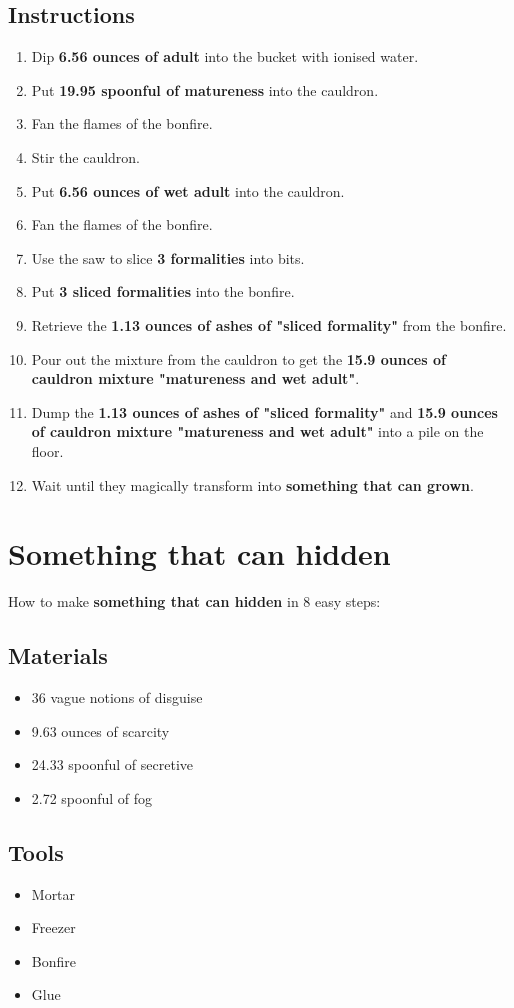 \documentclass{article}
\begin{document}
\subsection{Instructions}\begin{enumerate}
\item 
Dip \textbf{6.56 ounces of adult} into the bucket with ionised water.
\item 
Put \textbf{19.95 spoonful of matureness} into the cauldron.
\item 
Fan the flames of the bonfire.
\item 
Stir the cauldron.
\item 
Put \textbf{6.56 ounces of wet adult} into the cauldron.
\item 
Fan the flames of the bonfire.
\item 
Use the saw to slice \textbf{3 formalities} into bits.
\item 
Put \textbf{3 sliced formalities} into the bonfire.
\item 
Retrieve the \textbf{1.13 ounces of ashes of "sliced formality"} from the bonfire.
\item 
Pour out the mixture from the cauldron to get the \textbf{15.9 ounces of cauldron mixture "matureness and wet adult"}.
\item 
Dump the \textbf{1.13 ounces of ashes of "sliced formality"} and \textbf{15.9 ounces of cauldron mixture "matureness and wet adult"} into a pile on the floor.
\item 
Wait until they magically transform into \textbf{something that can grown}.
\end{enumerate}
\newpage
\section{Something that can hidden}How to make \textbf{something that can hidden} in 8 easy steps:

\subsection{Materials}\begin{itemize}
\item 
36 vague notions of disguise
\item 
9.63 ounces of scarcity
\item 
24.33 spoonful of secretive
\item 
2.72 spoonful of fog
\end{itemize}
\subsection{Tools}\begin{itemize}
\item 
Mortar
\item 
Freezer
\item 
Bonfire
\item 
Glue
\end{itemize}
\end{document}
